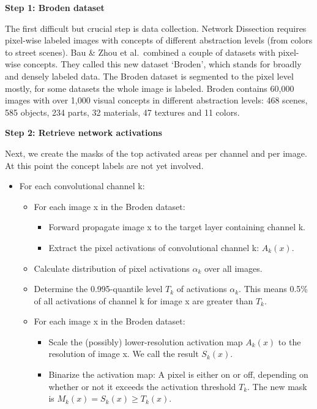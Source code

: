 \documentclass[
  10pt,
]{scrbook}
\providecommand{\tightlist}{%
  \setlength{\itemsep}{0pt}\setlength{\parskip}{0pt}}
\begin{document}
\textbf{Step 1: Broden dataset}

The first difficult but crucial step is data collection.
Network Dissection requires pixel-wise labeled images with concepts of different abstraction levels (from colors to street scenes).
Bau \& Zhou et al.~combined a couple of datasets with pixel-wise concepts.
They called this new dataset `Broden', which stands for broadly and densely labeled data.
The Broden dataset is segmented to the pixel level mostly, for some datasets the whole image is labeled.
Broden contains 60,000 images with over 1,000 visual concepts in different abstraction levels: 468 scenes, 585 objects, 234 parts, 32 materials, 47 textures and 11 colors.

\textbf{Step 2: Retrieve network activations}

Next, we create the masks of the top activated areas per channel and per image.
At this point the concept labels are not yet involved.

\begin{itemize}
\tightlist
\item
  For each convolutional channel k:

  \begin{itemize}
  \tightlist
  \item
    For each image x in the Broden dataset:

    \begin{itemize}
    \tightlist
    \item
      Forward propagate image x to the target layer containing channel k.
    \item
      Extract the pixel activations of convolutional channel k: \(A_k(x)\).
    \end{itemize}
  \item
    Calculate distribution of pixel activations \(\alpha_k\) over all images.
  \item
    Determine the 0.995-quantile level \(T_k\) of activations \(\alpha_k\). This means 0.5\% of all activations of channel k for image x are greater than \(T_k\).
  \item
    For each image x in the Broden dataset:

    \begin{itemize}
    \tightlist
    \item
      Scale the (possibly) lower-resolution activation map \(A_k(x)\) to the resolution of image x. We call the result \(S_k(x)\).
    \item
      Binarize the activation map: A pixel is either on or off, depending on whether or not it exceeds the activation threshold \(T_k\). The new mask is \(M_k(x)=S_k(x)\geq{}T_k(x)\).
    \end{itemize}
  \end{itemize}
\end{itemize}
\end{document}
